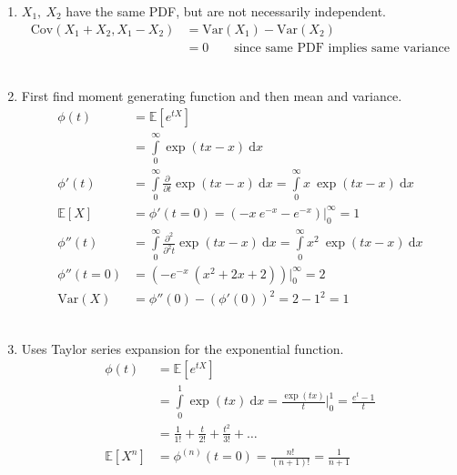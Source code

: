 \begin{enumerate}
	
	\item $ X_1,\ X_2 $ have the same PDF, but are not necessarily independent.\\
	
		\begin{align}
			\mathrm{Cov}(X_1 + X_2, X_1 - X_2) &= \mathrm{Var}(X_1) - \mathrm{Var}(X_2) \nonumber \\
			&= 0 \qquad \text{since same PDF implies same variance}
		\end{align} \\
	
	
	\item First find moment generating function and then mean and variance.\\
	
		\begin{align}
			\phi (t) &= \mathbb{E}[e^{tX}] \nonumber \\
			&= \int\limits_{0}^{\infty} \exp(tx - x)\ \mathrm{d} x \nonumber \\
			\phi'(t) &=  \int\limits_{0}^{\infty} \frac{\partial}{\partial t} \exp(tx - x)\ \mathrm{d} x = \int\limits_{0}^{\infty} x\ \exp(tx - x)\ \mathrm{d} x \nonumber \\
			\mathbb{E}[X] &= \phi'(t = 0) = \left(-x\ e^{-x} - e^{-x} \right)\Big|_0^{\infty}   = 1\\
			\phi''(t) &=  \int\limits_{0}^{\infty} \frac{\partial^2}{\partial^2 t} \exp(tx - x)\ \mathrm{d} x = \int\limits_{0}^{\infty} x^2\ \exp(tx - x)\ \mathrm{d} x \nonumber \\
			\phi''(t = 0) &= \left(-e^{-x}\ (x^2 + 2x + 2) \right)\Big|_0^{\infty} = 2  \\
			\mathrm{Var}(X) &= \phi''(0) - \left(\phi'(0)\right)^2 = 2 - 1^2 = 1
		\end{align} \\
	
	
	\item Uses Taylor series expansion for the exponential function.\\
	
		\begin{align}
			\phi (t) &= \mathbb{E}[e^{tX}] \nonumber \\
			&= \int\limits_{0}^{1} \exp(tx)\ \mathrm{d} x = \frac{\exp(tx)}{t} \Big|_0^1 = \frac{e^t - 1}{t}\nonumber \\
			&= \frac{1}{1!} + \frac{t}{2!} + \frac{t^2}{3!} + \dots \\
			\mathbb{E}[X^n] &= \phi^{(n)} (t = 0) = \frac{n!}{(n+1)!} = \frac{1}{n+1} \\
		\end{align} \\
	

\end{enumerate}
